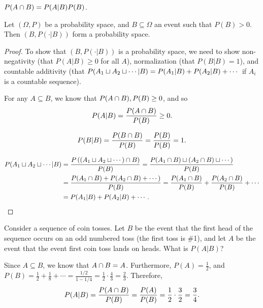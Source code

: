 \begin{cor}
    $P(A \cap B) = P(A | B)P(B)$.
\end{cor}

\begin{thm}
    Let $(\Omega, P)$ be a probability space, and $B \subseteq \Omega$ an event such that $P(B) > 0$. Then $(B, P(\cdot | B))$ form a probability space.
\end{thm}

\begin{proof}
    To show that $(B, P(\cdot|B))$ is a probability space, we need to show non-negativity (that $P(A | B) \geq 0$ for all $A$), normalization (that $P(B|B) = 1$), and countable additivity (that $P(A_1 \sqcup A_2 \sqcup \cdots | B) = P(A_1 | B) + P(A_2 | B) + \cdots$ if $A_i$ is a countable sequence).

    For any $A \subseteq B$, we know that $P(A \cap B), P(B) \geq 0$, and so \[P(A | B) = \frac{P(A \cap B)}{P(B)} \geq 0.\]

    \[P(B | B) = \frac{P(B \cap B)}{P(B)} = \frac{P(B)}{P(B)} = 1.\]

    \begin{align*}
        P(A_1 \sqcup A_2 \sqcup \cdots | B) &= \frac{P\left((A_1 \sqcup A_2 \sqcup \cdots) \cap B\right)}{P(B)} = \frac{P(A_1 \cap B) \sqcup (A_2 \cap B) \sqcup \cdots)}{P(B)} \\
        &= \frac{P(A_1 \cap B) + P(A_2 \cap B) + \cdots)}{P(B)} = \frac{P(A_1 \cap B)}{P(B)} + \frac{P(A_2 \cap B)}{P(B)} + \cdots \\
        &= P(A_1 | B) + P(A_2 | B) + \cdots.
    \end{align*}
\end{proof}

\begin{exmp}
    Consider a sequence of coin tosses. Let $B$ be the event that the first head of the sequence occurs on an odd numbered toss (the first toss is \#1), and let $A$ be the event that the event first coin toss lands on heads. What is $P(A | B)$?

    Since $A \subseteq B$, we know that $A \cap B = A$. Furthermore, $P(A) = \frac{1}{2}$, and $P(B) = \frac{1}{2} + \frac{1}{8} + \cdots = \frac{1/2}{1-1/4} = \frac{1}{2}\cdot\frac{4}{3} = \frac{2}{3}$. Therefore, \[P(A | B) = \frac{P(A \cap B)}{P(B)} = \frac{P(A)}{P(B)} = \frac{1}{2}\cdot\frac{3}{2} = \frac{3}{4}.\]
\end{exmp}

